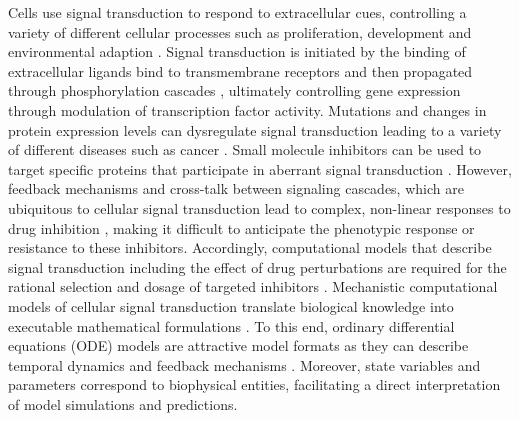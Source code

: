 \documentclass[11pt]{article}
\begin{document}
    Cells use signal transduction to respond to extracellular cues,
controlling a variety of different cellular processes such as
proliferation, development and environmental adaption
\cite{2754712/YK9CS8BY}. Signal transduction is initiated by the binding
of extracellular ligands bind to transmembrane receptors
\cite{2754712/QR4JIKLV} and then propagated through phosphorylation
cascades \cite{2754712/B6ZP8LH6} \cite{2754712/NPR437GQ}, ultimately
controlling gene expression through modulation of transcription factor
activity. Mutations and changes in protein expression levels can
dysregulate signal transduction leading to a variety of different
diseases such as cancer \cite{2754712/L8NRTXRQ}. Small molecule
inhibitors can be used to target specific proteins that participate in
aberrant signal transduction \cite{2754712/7ZXBI6XG}. However, feedback
mechanisms and cross-talk between signaling cascades, which are
ubiquitous to cellular signal transduction lead to complex, non-linear
responses to drug inhibition \cite{2754712/URVR5RD5}, making it
difficult to anticipate the phenotypic response or resistance to these
inhibitors. Accordingly, computational models that describe signal
transduction including the effect of drug perturbations are required for
the rational selection and dosage of targeted inhibitors
\cite{2754712/DUK5BLQ4}. Mechanistic computational models of cellular
signal transduction translate biological knowledge into executable
mathematical formulations \cite{2754712/6JVZVNVK}. To this end, ordinary
differential equations (ODE) models are attractive model formats as they
can describe temporal dynamics and feedback mechanisms
\cite{2754712/X784IDZJ}. Moreover, state variables and parameters
correspond to biophysical entities, facilitating a direct interpretation
of model simulations and predictions.
\end{document}
